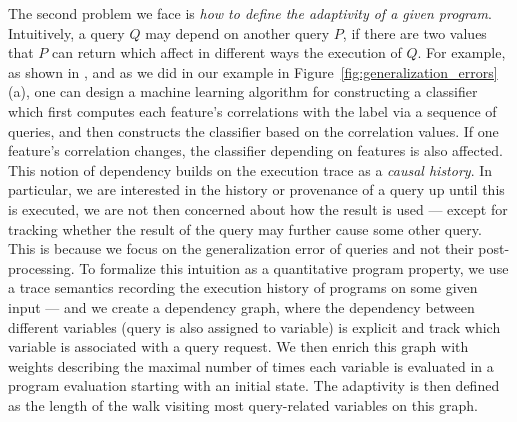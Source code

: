 The second problem we face is \emph{how to define the adaptivity of a given program}.
Intuitively, a query $Q$ may depend on another query $P$, if there are two values that $P$ can return which affect in different ways the execution of $Q$. 
For example, as shown in \cite{dwork2015reusable}, and as we did in our example in Figure~\ref{fig:generalization_errors}(a), one can design a machine learning algorithm for constructing a classifier which first computes each feature's correlations with the label via a sequence of queries, and then constructs the classifier based on the correlation values. 
If one feature's correlation changes, the classifier depending on features is also affected.  
This notion of dependency builds on the execution trace as a \emph{causal history}. 
In particular, we are interested in the history or provenance of a query up until this is executed, we are not then concerned about how the result is used --- except for tracking whether the result of the query may further cause some other query. 
This is because we focus on the generalization error of queries and not their post-processing. %
To formalize this intuition as a quantitative program property,
we use a trace semantics recording the execution history of programs on some given input --- and we create a dependency graph, where the dependency between different variables (query is also assigned to variable) is explicit and track which variable is associated with a query request. 
We then enrich this graph with weights describing the maximal number of times each variable is evaluated in a program evaluation starting with an initial state. The adaptivity is then defined as the length of the walk visiting most query-related variables on this graph. 

